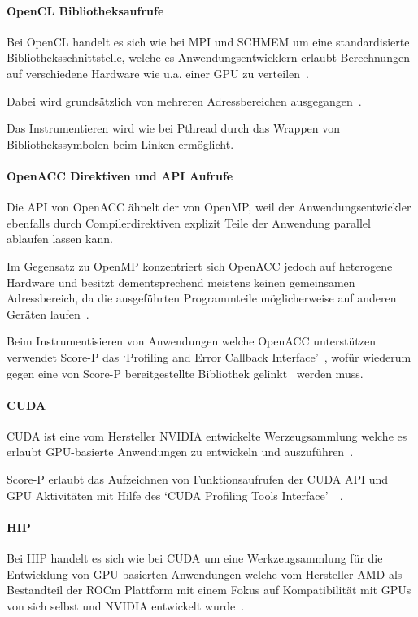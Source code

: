 \documentclass[german,proseminar,hyperref,utf8]{zihpub}
\begin{document}
    \paragraph{OpenCL Bibliotheksaufrufe}
    Bei OpenCL handelt es sich wie bei MPI und SCHMEM um eine standardisierte Bibliotheksschnittstelle,
    welche es Anwendungsentwicklern erlaubt Berechnungen auf verschiedene Hardware wie u.a. einer GPU
    zu verteilen~.
    
    Dabei wird grundsätzlich von mehreren Adressbereichen ausgegangen~.

    Das Instrumentieren wird wie bei Pthread durch das Wrappen von Bibliothekssymbolen beim
    Linken ermöglicht.

    \paragraph{OpenACC Direktiven und API Aufrufe}
    Die API von OpenACC ähnelt der von OpenMP, weil der Anwendungsentwickler ebenfalls durch
    Compilerdirektiven explizit Teile der Anwendung parallel ablaufen lassen kann.

    Im Gegensatz zu OpenMP konzentriert sich OpenACC jedoch auf heterogene Hardware und besitzt
    dementsprechend meistens keinen gemeinsamen Adressbereich, da die ausgeführten Programmteile
    möglicherweise auf anderen Geräten laufen~.

    Beim Instrumentisieren von Anwendungen welche OpenACC unterstützen verwendet Score-P das
    `Profiling and Error Callback Interface'~, wofür wiederum gegen eine
    von Score-P bereitgestellte Bibliothek gelinkt~
    werden muss.

    \paragraph{CUDA}
    CUDA ist eine vom Hersteller NVIDIA entwickelte Werzeugsammlung welche es erlaubt GPU-basierte
    Anwendungen zu entwickeln und auszuführen~.

    Score-P erlaubt das Aufzeichnen von Funktionsaufrufen der CUDA API und GPU Aktivitäten mit Hilfe des
    `CUDA Profiling Tools Interface'~~.

    \paragraph{HIP}
    Bei HIP handelt es sich wie bei CUDA um eine Werkzeugsammlung für die Entwicklung von GPU-basierten
    Anwendungen welche vom Hersteller AMD als Bestandteil der ROCm Plattform mit einem Fokus auf
    Kompatibilität mit GPUs von sich selbst und NVIDIA entwickelt wurde~.
\end{document}
